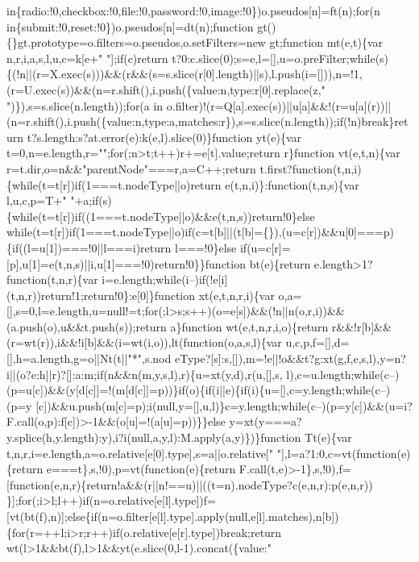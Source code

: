 \begin{DoxyCode}
{       in\{radio:!0,checkbox:!0,file:!0,password:!0,image:!0\})o.pseudos[n]=ft(n);for(n
       in\{submit:!0,reset:!0\})o.pseudos[n]=dt(n);function gt()\{\}gt.prototype=o.filters=o.pseudos,o.setFilters=new gt;function mt(e,t)\{var
       n,r,i,a,s,l,u,c=k[e+" "];if(c)return
       t?0:c.slice(0);s=e,l=[],u=o.preFilter;while(s)\{(!n||(r=X.exec(s)))&&(r&&(s=s.slice(r[0].length)||s),l.push(i=[])),n=!1,(r=U.exec(s))&&(n=r.shift(),i.push(\{value:n,type:r[0].replace(z,"
       ")\}),s=s.slice(n.length));for(a in
       o.filter)!(r=Q[a].exec(s))||u[a]&&!(r=u[a](r))||(n=r.shift(),i.push(\{value:n,type:a,matches:r\}),s=s.slice(n.length));if(!n)break\}return t?s.length:s?at.error(e):k(e,l).slice(0)\}function
       yt(e)\{var t=0,n=e.length,r="";for(;n>t;t++)r+=e[t].value;return r\}function vt(e,t,n)\{var
       r=t.dir,o=n&&"parentNode"===r,a=C++;return t.first?function(t,n,i)\{while(t=t[r])if(1===t.nodeType||o)return
       e(t,n,i)\}:function(t,n,s)\{var l,u,c,p=T+" "+a;if(s)\{while(t=t[r])if((1===t.nodeType||o)&&e(t,n,s))return!0\}else
       while(t=t[r])if(1===t.nodeType||o)if(c=t[b]||(t[b]=\{\}),(u=c[r])&&u[0]===p)\{if((l=u[1])===!0||l===i)return l===!0\}else
       if(u=c[r]=[p],u[1]=e(t,n,s)||i,u[1]===!0)return!0\}\}function bt(e)\{return e.length>1?function(t,n,r)\{var
       i=e.length;while(i--)if(!e[i](t,n,r))return!1;return!0\}:e[0]\}function xt(e,t,n,r,i)\{var
       o,a=[],s=0,l=e.length,u=null!=t;for(;l>s;s++)(o=e[s])&&(!n||n(o,r,i))&&(a.push(o),u&&t.push(s));return a\}function wt(e,t,n,r,i,o)\{return
       r&&!r[b]&&(r=wt(r)),i&&!i[b]&&(i=wt(i,o)),lt(function(o,a,s,l)\{var
       u,c,p,f=[],d=[],h=a.length,g=o||Nt(t||"*",s.nod
      eType?[s]:s,[]),m=!e||!o&&t?g:xt(g,f,e,s,l),y=n?i||(o?e:h||r)?[]:a:m;if(n&&n(m,y,s,l),r)\{u=xt(y,d),r(u,[],s,
      l),c=u.length;while(c--)(p=u[c])&&(y[d[c]]=!(m[d[c]]=p))\}if(o)\{if(i||e)\{if(i)\{u=[],c=y.length;while(c--)(p=y
      [c])&&u.push(m[c]=p);i(null,y=[],u,l)\}c=y.length;while(c--)(p=y[c])&&(u=i?F.call(o,p):f[c])>-1&&(o[u]=!(a[u]=p))\}\}else y=xt(y===a?y.splice(h,y.length):y),i?i(null,a,y,l):M.apply(a,y)\})\}function Tt(e)\{var
       t,n,r,i=e.length,a=o.relative[e[0].type],s=a||o.relative[" "],l=a?1:0,c=vt(function(e)\{return
       e===t\},s,!0),p=vt(function(e)\{return
       F.call(t,e)>-1\},s,!0),f=[function(e,n,r)\{return!a&&(r||n!==u)||((t=n).nodeType?c(e,n,r):p(e,n,r))
      \}];for(;i>l;l++)if(n=o.relative[e[l].type])f=[vt(bt(f),n)];else\{if(n=o.filter[e[l].type].apply(null,e[l].matches),n[b])\{for(r=++l;i>r;r++)if(o.relative[e[r].type])break;return
       wt(l>1&&bt(f),l>1&&yt(e.slice(0,l-1).concat(\{value:"
}
\end{DoxyCode}
